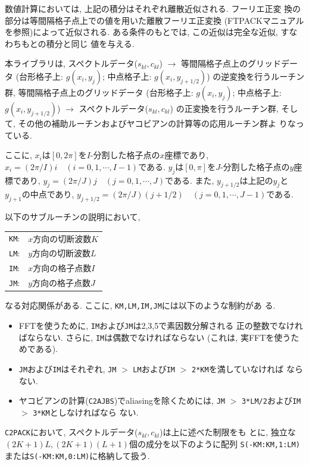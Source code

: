\documentclass[a4j,fleqn]{jarticle}
\begin{document}
数値計算においては, 上記の積分はそれぞれ離散近似される. フーリエ正変
換の部分は等間隔格子点上での値を用いた離散フーリエ正変換
(FTPACKマニュアルを参照)によって近似される.
ある条件のもとでは, この近似は完全な近似, すなわちもとの積分と同じ
値を与える.

本ライブラリは, 
スペクトルデータ($s_{kl},c_{kl}$) 
$\to$ 等間隔格子点上のグリッドデータ
(台形格子上: $g(x_i,y_j)$; 中点格子上: $g(x_i,y_{j+1/2})$)
の逆変換を行うルーチン群,
等間隔格子点上のグリッドデータ
(台形格子上: $g(x_i,y_j)$; 中点格子上: $g(x_i,y_{j+1/2})$)
$\to$ スペクトルデータ($s_{kl},c_{kl}$) 
の正変換を行うルーチン群, 
そして, その他の補助ルーチンおよびヤコビアンの計算等の応用ルーチン群よ
りなっている.

ここに, $x_i$は$[0,2\pi]$を$I$-分割した格子点の$x$座標であり,
$x_i=(2\pi/I)i\quad (i=0,1,\cdots,I-1)$である.
$y_j$は$[0,\pi]$を$J$-分割した格子点の$y$座標であり,
$y_j=(2\pi/J)j\quad (j=0,1,\cdots,J)$である.
また, $y_{j+1/2}$は上記の$y_{j}$と$y_{j+1}$の中点であり,
$y_{j+1/2}=(2\pi/J)(j+1/2)\quad (j=0,1,\cdots,J-1)$である.

以下のサブルーチンの説明において,
\begin{center}
\begin{tabular}{rl}
{\tt KM}:& $x$方向の切断波数$K$\\
{\tt LM}:& $y$方向の切断波数$L$\\
{\tt IM}:& $x$方向の格子点数$I$\\
{\tt JM}:& $y$方向の格子点数$J$
\end{tabular}
\end{center}
なる対応関係がある. ここに, {\tt KM,LM,IM,JM}には以下のような制約があ
る.

\begin{itemize}
\item FFTを使うために, {\tt IM}および{\tt JM}は2,3,5で素因数分解される
正の整数でなければならない. さらに, {\tt IM}は偶数でなければならない
(これは, 実FFTを使うためである).

\item {\tt JM}および{\tt IM}はそれぞれ, 
{\tt JM} $>$ {\tt LM}および{\tt IM} $>$ {\tt 2*KM}を満していなければ
ならない.

\item ヤコビアンの計算({\tt C2AJBS})でaliasingを除くためには, 
{\tt JM} $>$ {\tt 3*LM/2}および{\tt IM} $>$ {\tt 3*KM}としなければなら
ない.
\end{itemize}

{\tt C2PACK}において, スペクトルデータ($s_{kl},c_{kl}$)は上に述べた制限をも
とに, 独立な$(2K+1)L,(2K+1)(L+1)$個の成分を以下のように配列
{\tt S(-KM:KM,1:LM)}または{\tt S(-KM:KM,0:LM)}に格納して扱う.
\end{document}
